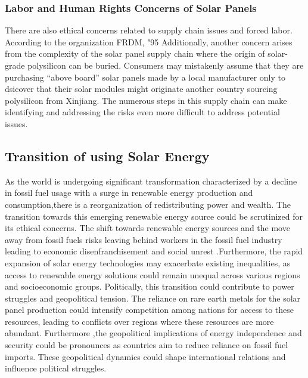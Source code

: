 \documentclass[10pt,twocolumn]{article}
\begin{document}
\subsubsection{Labor and Human Rights Concerns of Solar Panels}There are also ethical concerns related to supply chain issues and forced labor. According to the organization FRDM, "95%
Additionally, another concern arises from the complexity of the solar panel supply chain where the origin of solar-grade polysilicon can be buried. Consumers may mistakenly assume that they are purchasing “above board” solar panels made by a local manufacturer only to dsicover that their solar modules might originate another country sourcing polysilicon from Xinjiang. The numerous steps in this supply chain can make identifying and addressing the risks even more difficult to address potential issues. 
\subsection{Transition of using Solar Energy}
As the world is undergoing significant transformation characterized by a decline in fossil fuel usage with a surge in renewable energy production and consumption,there is a reorganization of redistributing power and wealth. The transition towards this emerging renewable energy source could be scrutinized for its ethical concerns. The shift towards renewable energy sources and the move away from fossil fuels risks leaving behind workers in the fossil fuel industry leading to economic disenfranchisement and social unrest .Furthermore, the rapid expansion of solar energy technologies may exacerbate existing inequalities, as access to renewable energy solutions could remain unequal across various regions and socioeconomic groups. Politically, this transition could contribute to power struggles and geopolitical tension. The reliance on rare earth metals for the solar panel production could intensify competition among nations for access to these resources, leading to conflicts over regions where these resources are more abundant. Furthermore ,the geopolitical implications of energy independence and security could be pronounces as countries aim to reduce reliance on fossil fuel imports. These geopolitical dynamics could shape international relations and influence political struggles. 
\end{document}
